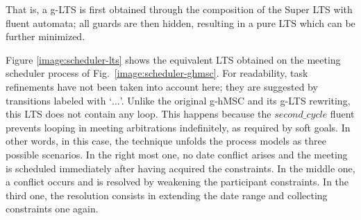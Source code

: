 That is, a g-LTS is first obtained through the composition of the Super LTS with fluent automata; all guards are then hidden, resulting in a pure LTS which can be further minimized.

Figure \ref{image:scheduler-lts} shows the equivalent LTS obtained on the meeting scheduler process of Fig.~\ref{image:scheduler-ghmsc}. For readability, task refinements have not been taken into account here; they are suggested by transitions labeled with `$\ldots$'. Unlike the original g-hMSC and its g-LTS rewriting, this LTS does not contain any loop. This happens because the $second\_cycle$ fluent prevents looping in meeting arbitrations indefinitely, as required by soft goals. In other words, in this case, the technique unfolds the process models as three possible scenarios. In the right most one, no date conflict arises and the meeting is scheduled immediately after having acquired the constraints. In the middle one, a conflict occurs and is resolved by weakening the participant constraints. In the third one, the resolution consists in extending the date range and collecting constraints one again.

